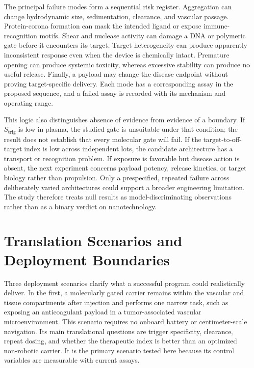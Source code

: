 \documentclass[conference]{IEEEtran}
\begin{document}
The principal failure modes form a sequential risk register. Aggregation can change hydrodynamic size, sedimentation, clearance, and vascular passage. Protein-corona formation can mask the intended ligand or expose immune-recognition motifs. Shear and nuclease activity can damage a DNA or polymeric gate before it encounters its target. Target heterogeneity can produce apparently inconsistent response even when the device is chemically intact. Premature opening can produce systemic toxicity, whereas excessive stability can produce no useful release. Finally, a payload may change the disease endpoint without proving target-specific delivery. Each mode has a corresponding assay in the proposed sequence, and a failed assay is recorded with its mechanism and operating range.

This logic also distinguishes absence of evidence from evidence of a boundary. If $S_{\mathrm{trig}}$ is low in plasma, the studied gate is unsuitable under that condition; the result does not establish that every molecular gate will fail. If the target-to-off-target index is low across independent lots, the candidate architecture has a transport or recognition problem. If exposure is favorable but disease action is absent, the next experiment concerns payload potency, release kinetics, or target biology rather than propulsion. Only a prespecified, repeated failure across deliberately varied architectures could support a broader engineering limitation. The study therefore treats null results as model-discriminating observations rather than as a binary verdict on nanotechnology.

\section{Translation Scenarios and Deployment Boundaries}
\label{sec:translation}
Three deployment scenarios clarify what a successful program could realistically deliver. In the first, a molecularly gated carrier remains within the vascular and tissue compartments after injection and performs one narrow task, such as exposing an anticoagulant payload in a tumor-associated vascular microenvironment. This scenario requires no onboard battery or centimeter-scale navigation. Its main translational questions are trigger specificity, clearance, repeat dosing, and whether the therapeutic index is better than an optimized non-robotic carrier. It is the primary scenario tested here because its control variables are measurable with current assays.
\end{document}
